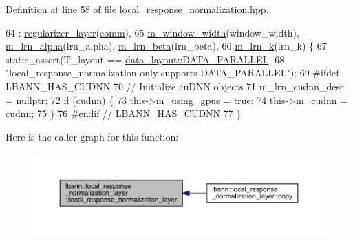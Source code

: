 Definition at line 58 of file local\+\_\+response\+\_\+normalization.\+hpp.


\begin{DoxyCode}
64     : \hyperlink{classlbann_1_1regularizer__layer_a2ebf3877b905b479a0250b74cf8f68b3}{regularizer\_layer}(\hyperlink{file__io_8cpp_ab048c6f9fcbcfaa57ce68b00263dbebe}{comm}),
65       \hyperlink{classlbann_1_1local__response__normalization__layer_a4914619a19eb43efcf8240b8a1e0c090}{m\_window\_width}(window\_width), \hyperlink{classlbann_1_1local__response__normalization__layer_a85c25a68888e2e9d163a820326fc09ff}{m\_lrn\_alpha}(lrn\_alpha), 
      \hyperlink{classlbann_1_1local__response__normalization__layer_ad06848e9d59664be86aecbc1e2ba556f}{m\_lrn\_beta}(lrn\_beta),
66       \hyperlink{classlbann_1_1local__response__normalization__layer_a896f875d6f6a763c1cb0dbd43679164e}{m\_lrn\_k}(lrn\_k) \{
67     static\_assert(T\_layout == \hyperlink{base_8hpp_a786677cbfb3f5677b4d84f3056eb08dba37d2a3465f7cbf4ab60f4e79944d0638}{data\_layout::DATA\_PARALLEL},
68                   \textcolor{stringliteral}{"local\_response\_normalization only supports DATA\_PARALLEL"});
69 \textcolor{preprocessor}{  #ifdef LBANN\_HAS\_CUDNN}
70     \textcolor{comment}{// Initialize cuDNN objects}
71     m\_lrn\_cudnn\_desc = \textcolor{keyword}{nullptr};
72     \textcolor{keywordflow}{if} (cudnn) \{
73       this->\hyperlink{classlbann_1_1Layer_af7881cb5eff5207c15fa835d65462e8f}{m\_using\_gpus} = \textcolor{keyword}{true};
74       this->\hyperlink{classlbann_1_1Layer_a08dbb94239e3b8c96329786c57c72e21}{m\_cudnn} = cudnn;
75     \}
76 \textcolor{preprocessor}{  #endif // LBANN\_HAS\_CUDNN}
77   \}
\end{DoxyCode}
Here is the caller graph for this function\+:\nopagebreak
\begin{figure}[H]
\begin{center}
\leavevmode
\includegraphics[width=350pt]{classlbann_1_1local__response__normalization__layer_a5fa2f3175590cc85aa984c42cc9acd95_icgraph}
\end{center}
\end{figure}
\mbox{\label{classlbann_1_1local__response__normalization__layer_a95f89c53da64c319def098a7153c57f6}} 
